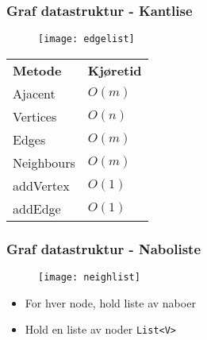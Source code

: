 \documentclass{article}
\begin{document}
    \subsubsection{Graf datastruktur - Kantlise}

    \begin{figure}[H]
        \begin{center}
            \texttt{[image: edgelist]}
        \end{center}
    \end{figure}

    \begin{table}[H]
        \begin{center}
            \begin{tabular}[c]{|l|l|}
                \hline
                \textbf{Metode} & \textbf{Kjøretid} \\
                Ajacent & \( O\left( m \right) \) \\
                Vertices & \( O\left( n \right) \) \\
                Edges & \( O\left( m \right) \) \\
                Neighbours & \( O\left( m \right) \) \\
                addVertex & \( O\left( 1 \right) \)\\
                addEdge & \( O\left( 1 \right) \) \\
                \hline
            \end{tabular}
        \end{center}
    \end{table}

    \subsubsection{Graf datastruktur - Naboliste}

    \begin{figure}[H]
        \begin{center}
            \texttt{[image: neighlist]}
        \end{center}
    \end{figure}

    \begin{itemize}
        \item For hver node, hold liste av naboer
        \item Hold en liste av noder \texttt{List<V>}
    \end{itemize}
\end{document}
